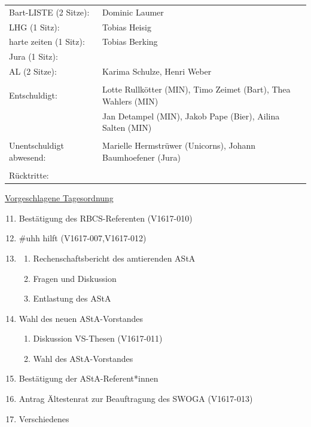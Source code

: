 \documentclass[ngerman,headheight=70pt]{scrartcl}
\begin{document}
\begin{tabular}{ll}
             Bart-LISTE (2 Sitze): & Dominic Laumer \\
             LHG (1 Sitz): & Tobias Heisig \\
             harte zeiten (1 Sitz): & Tobias Berking \\
             Jura (1 Sitz): &  \\
             AL (2 Sitze): & Karima Schulze, Henri Weber \\
            & \\
        Entschuldigt: & Lotte Rullkötter (MIN), Timo Zeimet (Bart), Thea Wahlers (MIN)\\
                      & Jan Detampel (MIN), Jakob Pape (Bier), Ailina Salten (MIN)\\
                      & \\
        Unentschuldigt abwesend: &  Marielle Hermstrüwer (Unicorns), Johann Baumhoefener (Jura)\\
                                &\\
        Rücktritte: & \\
    \end{tabular}
    \newpage
    \underline{Vorgeschlagene Tagesordnung}
    \begin{enumerate}[label={\textbf{Top \theenumi}},leftmargin=*]
        \setcounter{enumi}{10}
        \item Bestätigung des RBCS-Referenten (V1617-010)
        \item \#uhh hilft (V1617-007,V1617-012)
        \item
            \begin{enumerate}
                \item Rechenschaftsbericht des amtierenden AStA
                \item Fragen und Diskussion
                \item Entlastung des AStA
            \end{enumerate}
        \item Wahl des neuen AStA-Vorstandes
            \begin{enumerate}
                \item Diskussion VS-Thesen (V1617-011)
                \item Wahl des AStA-Vorstandes
            \end{enumerate}
        \item Bestätigung der AStA-Referent*innen
        \item Antrag Ältestenrat zur Beauftragung des SWOGA (V1617-013)
        \item Verschiedenes
    \end{enumerate}
\end{document}
